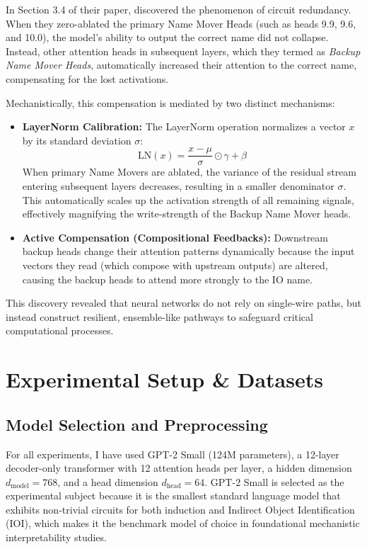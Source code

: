 \documentclass[11pt]{article}
\begin{document}
In Section 3.4 of their paper, \citet{wang2022} discovered the phenomenon of circuit redundancy. When they zero-ablated the primary Name Mover Heads (such as heads 9.9, 9.6, and 10.0), the model's ability to output the correct name did not collapse. Instead, other attention heads in subsequent layers, which they termed as \textit{Backup Name Mover Heads}, automatically increased their attention to the correct name, compensating for the lost activations.

Mechanistically, this compensation is mediated by two distinct mechanisms:
\begin{itemize}
    \item \textbf{LayerNorm Calibration:} The LayerNorm operation normalizes a vector $x$ by its standard deviation $\sigma$:
    \begin{equation}
        \text{LN}(x) = \frac{x - \mu}{\sigma} \odot \gamma + \beta
    \end{equation}
    When primary Name Movers are ablated, the variance of the residual stream entering subsequent layers decreases, resulting in a smaller denominator $\sigma$. This automatically scales up the activation strength of all remaining signals, effectively magnifying the write-strength of the Backup Name Mover heads.
    \item \textbf{Active Compensation (Compositional Feedbacks):} Downstream backup heads change their attention patterns dynamically because the input vectors they read (which compose with upstream outputs) are altered, causing the backup heads to attend more strongly to the $\text{IO}$ name.
\end{itemize}
This discovery revealed that neural networks do not rely on single-wire paths, but instead construct resilient, ensemble-like pathways to safeguard critical computational processes.

\section{Experimental Setup \& Datasets}

\subsection{Model Selection and Preprocessing}

For all experiments, I have used GPT-2 Small (124M parameters), a 12-layer decoder-only transformer with 12 attention heads per layer, a hidden dimension $d_{\text{model}} = 768$, and a head dimension $d_{\text{head}} = 64$. GPT-2 Small is selected as the experimental subject because it is the smallest standard language model that exhibits non-trivial circuits for both induction and Indirect Object Identification (IOI), which makes it the benchmark model of choice in foundational mechanistic interpretability studies. 
\end{document}

